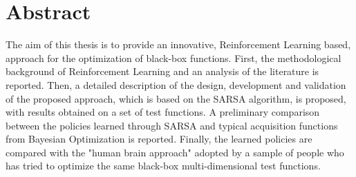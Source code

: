 \chapter*{Abstract}
\pagestyle{plain}

The aim of this thesis is to provide an innovative, Reinforcement Learning based, approach for the optimization of black-box functions. First, the methodological background of Reinforcement Learning and an analysis of the literature is reported. Then, a detailed description of the design, development and validation of the proposed approach, which is based on the SARSA algorithm, is proposed, with results obtained on a set of test functions. A preliminary comparison between the policies learned through SARSA and typical acquisition functions from Bayesian Optimization is reported. Finally, the learned policies are compared with the "human brain approach" adopted by a sample of people who has tried to optimize the same black-box multi-dimensional test functions.